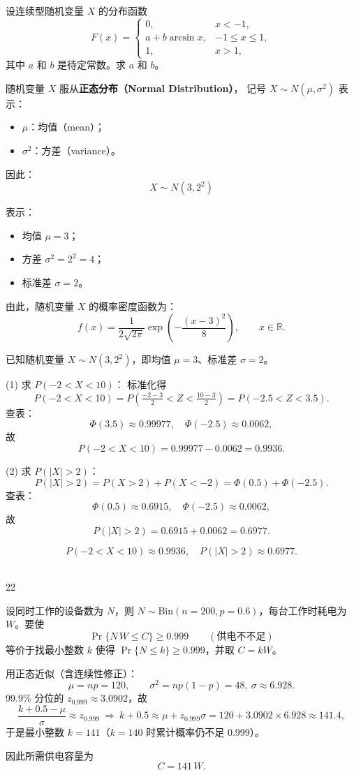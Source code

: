 \begin{homework}[2.25]
设连续型随机变量 $X$ 的分布函数
\[
F(x) =
\begin{cases}
0, & x < -1, \\[6pt]
a + b \arcsin x, & -1 \leq x \leq 1, \\[6pt]
1, & x > 1,
\end{cases}
\]
其中 $a$ 和 $b$ 是待定常数。求 $a$ 和 $b$。
\end{homework}
\begin{dxtips}
随机变量 \( X \) 服从\textbf{正态分布（Normal Distribution）}，  
记号 \( X \sim N(\mu, \sigma^2) \) 表示：
\begin{itemize}
  \item \(\mu\)：均值（mean）；
  \item \(\sigma^2\)：方差（variance）。
\end{itemize}

\medskip
因此：
\[
X \sim N(3, 2^2)
\]

表示：
\begin{itemize}
  \item 均值 \(\mu = 3\)；
  \item 方差 \(\sigma^2 = 2^2 = 4\)；
  \item 标准差 \(\sigma = 2\)。
\end{itemize}

\medskip
由此，随机变量 \(X\) 的概率密度函数为：
\[
f(x) = \frac{1}{2\sqrt{2\pi}} 
\exp\!\left(-\frac{(x-3)^2}{8}\right), 
\qquad x \in \mathbb{R}.
\]
\end{dxtips}
\begin{solution}
已知随机变量 \( X \sim N(3,2^2) \)，即均值 \(\mu=3\)、标准差 \(\sigma=2\)。

(1) 求 \(P(-2<X<10)\)：  
标准化得
\[
P(-2<X<10)=P\!\left(\tfrac{-2-3}{2}<Z<\tfrac{10-3}{2}\right)
=P(-2.5<Z<3.5).
\]
查表：
\[
\Phi(3.5)\approx0.99977,\quad \Phi(-2.5)\approx0.0062,
\]
故
\[
P(-2<X<10)=0.99977-0.0062=0.9936.
\]

(2) 求 \(P(|X|>2)\)：  
\[
P(|X|>2)=P(X>2)+P(X<-2)
=\Phi(0.5)+\Phi(-2.5).
\]
查表：
\[
\Phi(0.5)\approx0.6915,\quad \Phi(-2.5)\approx0.0062,
\]
故
\[
P(|X|>2)=0.6915+0.0062=0.6977.
\]

\[
\boxed{
P(-2<X<10)\approx0.9936,\quad
P(|X|>2)\approx0.6977.}
\]
\end{solution}
\\22
\begin{solution}
设同时工作的设备数为 $N$，则 $N\sim\mathrm{Bin}(n=200,p=0.6)$，每台工作时耗电为 $W$。要使
\[
\Pr\{N\,W\le C\}\ge 0.999\qquad (\text{供电不不足})
\]
等价于找最小整数 $k$ 使得 $\Pr\{N\le k\}\ge 0.999$，并取 $C=kW$。

用正态近似（含连续性修正）：
\[
\mu=np=120,\qquad \sigma^2=np(1-p)=48,\ \sigma\approx6.928.
\]
99.9\% 分位的 $z_{0.999}\approx 3.0902$，故
\[
\frac{k+0.5-\mu}{\sigma}\approx z_{0.999}
\ \Rightarrow\
k+0.5\approx \mu+z_{0.999}\sigma
=120+3.0902\times6.928\approx141.4,
\]
于是最小整数 $k=141$（$k=140$ 时累计概率仍不足 0.999）。

因此所需供电容量为
\[
\boxed{C=141\,W.}
\]
\end{solution}
